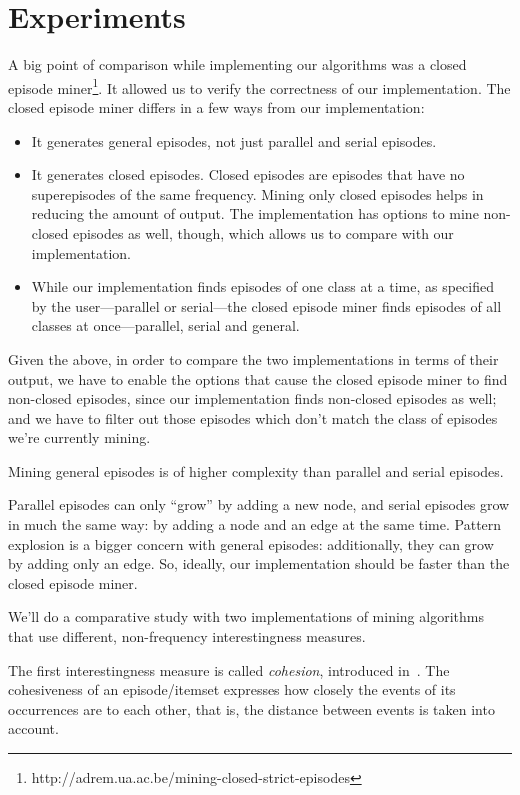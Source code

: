 \chapter{Experiments}
\label{sec:experiments}

A big point of comparison while implementing our algorithms was a closed episode miner\footnote{http://adrem.ua.ac.be/mining-closed-strict-episodes}. It allowed us to verify the correctness of our implementation. The closed episode miner differs in a few ways from our implementation:

\begin{itemize}
\item It generates general episodes, not just parallel and serial episodes.
\item It generates closed episodes. Closed episodes are episodes that have no superepisodes of the same frequency. Mining only closed episodes helps in reducing the amount of output. The implementation has options to mine non-closed episodes as well, though, which allows us to compare with our implementation.
\item While our implementation finds episodes of one class at a time, as specified by the user---parallel or serial---the closed episode miner finds episodes of all classes at once---parallel, serial and general.
\end{itemize}

Given the above, in order to compare the two implementations in terms of their output, we have to enable the options that cause the closed episode miner to find non-closed episodes, since our implementation finds non-closed episodes as well; and we have to filter out those episodes which don't match the class of episodes we're currently mining.

Mining general episodes is of higher complexity than parallel and serial episodes.

Parallel episodes can only ``grow'' by adding a new node, and serial episodes grow in much the same way: by adding a node and an edge at the same time. Pattern explosion is a bigger concern with general episodes: additionally, they can grow by adding only an edge. So, ideally, our implementation should be faster than the closed episode miner.


We'll do a comparative study with two implementations of mining algorithms that use different, non-frequency interestingness measures.

The first interestingness measure is called \emph{cohesion}, introduced in~\citep{cule2016efficient}. The cohesiveness of an episode/itemset expresses how closely the events of its occurrences are to each other, that is, the distance between events is taken into account.

